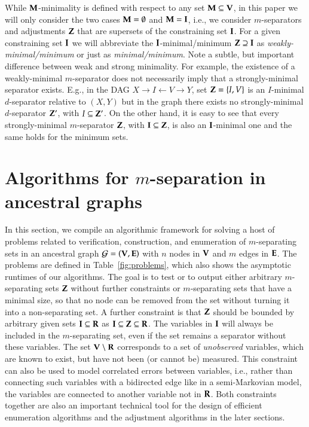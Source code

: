 While ${\bf M}$-minimality is defined with respect to any set ${\bf M} \subseteq {\bf V}$, in this 
paper we will only consider the two cases ${\bf M}=\emptyset$ and ${\bf M}={\bf I}$, i.e., we
consider $m$-separators and adjustments
${\bf Z}$ that are supersets of the constraining set ${\bf I}$.
For a given constraining set ${\bf I}$ we will abbreviate the 
${\bf I}$-minimal/minimum ${\bf Z}\supseteq {\bf I}$ as \emph{weakly-minimal/minimum} or just 
as \emph{minimal/minimum}.
Note a subtle, but important difference between
weak and strong minimality.
For example, the existence of a weakly-minimal $m$-separator 
does not necessarily imply that a strongly-minimal separator exists.
E.g., in the DAG $X \to I \gets V \to Y$, set ${\bf Z}=\{I,V\}$ is 
an $I$-minimal $d$-separator relative to $(X,Y)$ but in the graph
there exists no strongly-minimal $d$-separator  ${\bf Z}'$,
with $I \subseteq {\bf Z}'$. On the other hand, it is easy to see that 
every strongly-minimal $m$-separator ${\bf Z}$, with ${\bf I}\subseteq {\bf Z}$,  
is also an ${\bf I}$-minimal one and the same holds for the minimum sets.


%

\section{Algorithms for $m$-separation in ancestral graphs}

\label{sec:algo}

In this section, we compile an algorithmic framework for solving a host of 
problems related to verification, construction, and enumeration of 
$m$-separating sets in an ancestral graph ${\cal G} = ({\bf V},{\bf E})$ with 
$n$ nodes in ${\bf V}$ and $m$ edges in ${\bf E}$. 
The problems are defined in 
Table~\ref{fig:problems}, which also shows the asymptotic runtimes of our algorithms. %
The  goal is to test or to output %
either arbitrary $m$-separating sets ${\bf Z}$ without further constraints 
or $m$-separating sets that have a minimal size, so that no node 
can be removed from the set without turning it into a non-separating set.  
%
A further constraint is that ${\bf Z}$ should be bounded by arbitrary given sets ${\bf I} \subseteq {\bf R}$ as ${\bf I} \subseteq {\bf Z} \subseteq {\bf R}$. The variables in ${\bf I}$ will always be included in the $ m $-separating set, even if the set remains a separator without these variables. The set ${\bf V}\setminus{\bf R}$ corresponds to a set of \emph{unobserved} variables, which are known to exist, but have not been (or cannot be) measured. This constraint can also be used to model correlated errors between variables, i.e., rather than connecting such variables with a bidirected edge like in a semi-Markovian model, the variables are connected to another variable not in ${\bf R}$.  Both constraints together are also an important technical tool for the design of efficient enumeration algorithms and the adjustment algorithms in the later sections.

